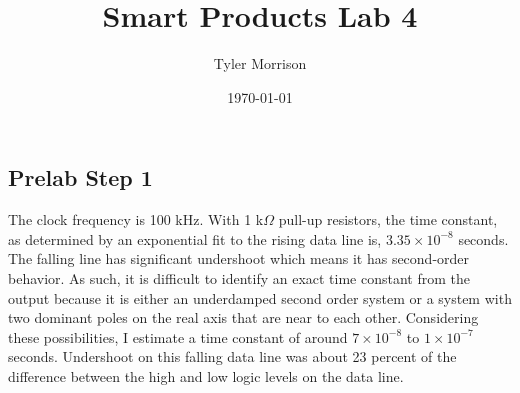 \documentclass{article}
\title{Smart Products Lab 4}
\author{Tyler Morrison}
\date\today
\begin{document}
\maketitle
\section{}
\subsection{Prelab Step 1}
The clock frequency is 100 kHz.
With 1 k$\Omega$ pull-up resistors, the time constant, as determined by an exponential fit to the rising data line is, $3.35 \times 10^{-8}$ seconds.
The falling line has significant undershoot which means it has second-order behavior. As such, it is difficult to identify an exact time constant from the output because it is either an underdamped second order system or a system with two dominant poles on the real axis that are near to each other. Considering these possibilities, I estimate a time constant of around $7 \times 10^{-8}$ to $1 \times 10^{-7}$ seconds.
Undershoot on this falling data line was about 23 percent of the difference between the high and low logic levels on the data line.
\end{document}
